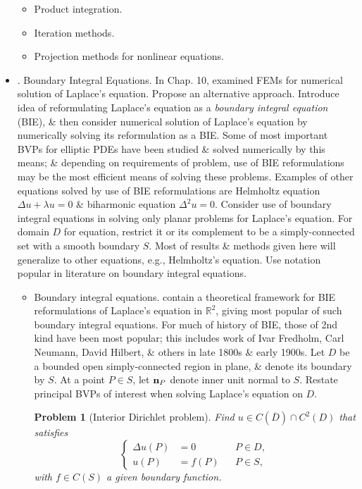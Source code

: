 \documentclass{article}
\newtheorem{problem}{Problem}
\begin{document}
\begin{itemize}
\begin{itemize}
		\item {\sf Product integration.}
		\item {\sf Iteration methods.}
		\item {\sf Projection methods for nonlinear equations.}
	\end{itemize}
	\item {. Boundary Integral Equations.} In Chap. 10, examined FEMs for numerical solution of Laplace's equation. Propose an alternative approach. Introduce idea of reformulating Laplace's equation as a {\it boundary integral equation} (BIE), \& then consider numerical solution of Laplace's equation by numerically solving its reformulation as a BIE. Some of most important BVPs for elliptic PDEs have been studied \& solved numerically by this means; \& depending on requirements of problem, use of BIE reformulations may be the most efficient means of solving these problems. Examples of other equations solved by use of BIE reformulations are Helmholtz equation $\Delta u + \lambda u = 0$ \& biharmonic equation $\Delta^2u = 0$. Consider use of boundary integral equations in solving only planar problems for Laplace's equation. For domain $D$ for equation, restrict it or its complement to be a simply-connected set with a smooth boundary $S$. Most of results \& methods given here will generalize to other equations, e.g., Helmholtz's equation. Use notation popular in literature on boundary integral equations.
	\begin{itemize}
		\item {\sf Boundary integral equations.} contain a theoretical framework for BIE reformulations of Laplace's equation in $\mathbb{R}^2$, giving most popular of such boundary integral equations. For much of history of BIE, those of 2nd kind have been most popular; this includes work of {\sc Ivar Fredholm, Carl Neumann, David Hilbert}, \& others in late 1800s \& early 1900s. Let $D$ be a bounded open simply-connected region in plane, \& denote its boundary by $S$. At a point $P\in S$, let ${\bf n}_P$ denote inner unit normal to $S$. Restate principal BVPs of interest when solving Laplace's equation on $D$.
		
		\begin{problem}[Interior Dirichlet problem]
			Find $u\in C(\overline{D})\cap C^2(D)$ that satisfies
			\begin{equation}
				\label{interior Dirichlet prob}
				\left\{\begin{split}
					\Delta u(P) &= 0&&P\in D,\\
					u(P) &= f(P)&&P\in S,
				\end{split}\right.
			\end{equation}
			with $f\in C(S)$ a given boundary function.
		\end{problem}
		

\end{itemize}
\end{itemize}
\end{document}
